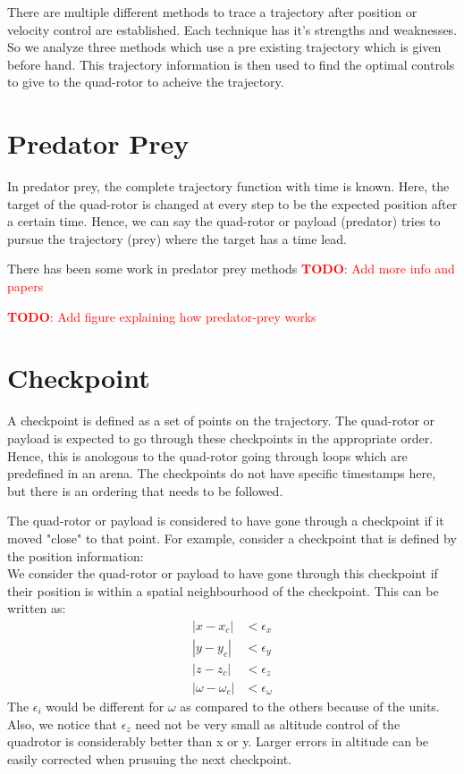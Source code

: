 \documentclass[BTech]{iitmdiss}
\newcommand\todo[1]{\textcolor{red}{{\bf TODO}: #1}}
\begin{document}
There are multiple different methods to trace a trajectory after position or velocity control are established. Each technique has it's strengths and weaknesses. So we analyze three methods which use a pre existing trajectory which is given before hand. This trajectory information is then used to find the optimal controls to give to the quad-rotor to acheive the trajectory.

\section{Predator Prey}

In predator prey, the complete trajectory function with time is known. Here, the target of the quad-rotor is changed at every step to be the expected position after a certain time. Hence, we can say the quad-rotor or payload (predator) tries to pursue the trajectory (prey) where the target has a time lead.

There has been some work in predator prey methods \todo{Add more info and papers}

\todo{Add figure explaining how predator-prey works}

\section{Checkpoint}

A checkpoint is defined as a set of points on the trajectory. The quad-rotor or payload is expected to go through these checkpoints in the appropriate order. Hence, this is anologous to the quad-rotor going through loops which are predefined in an arena. The checkpoints do not have specific timestamps here, but there is an ordering that needs to be followed.

The quad-rotor or payload is considered to have gone through a checkpoint if it moved "close" to that point. For example, consider a checkpoint that is defined by the position information:
\begin{equation}
  [x_c, y_c, z_y, \omega_c]
\end{equation}
We consider the quad-rotor or payload to have gone through this checkpoint if their position is within a spatial neighbourhood of the checkpoint. This can be written as:
\begin{equation} \begin{split}
  |x - x_c| &< \epsilon_x \\
  |y - y_c| &< \epsilon_y \\
  |z - z_c| &< \epsilon_z \\
  |\omega - \omega_c| &< \epsilon_\omega
\end{split} \end{equation}
The $\epsilon_i$ would be different for $\omega$ as compared to the others because of the units. Also, we notice that $\epsilon_z$ need not be very small as altitude control of the quadrotor is considerably better than x or y. Larger errors in altitude can be easily corrected when prusuing the next checkpoint.
\end{document}
